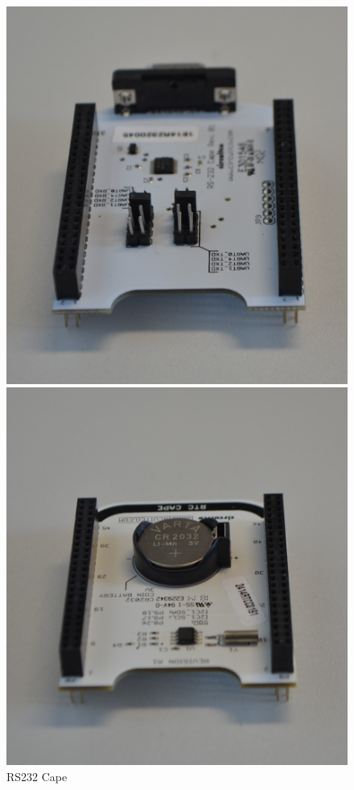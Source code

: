 \begin{figure}[H]
  \includegraphics[width=\linewidth]{img/general/CapeRS232.png}
  \caption{RS232 Cape}\label{figure_CapeRS232}
\endminipage\hfill
{}
  \includegraphics[width=\linewidth]{img/general/CapeRTC.png}

\end{figure}

